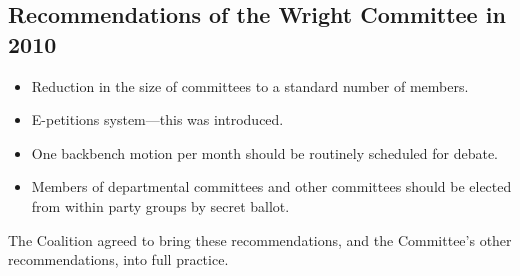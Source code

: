 \documentclass[12pt]{article}
\begin{document}
\subsection*{Recommendations of the Wright Committee in 2010}

\begin{itemize}
	\item{Reduction in the size of committees to a standard number of members.}
	\item{E-petitions system---this was introduced.}
	\item{One backbench motion per month should be routinely scheduled for debate.}
	\item{Members of departmental committees and other committees should be elected from within party groups by secret ballot.}
\end{itemize}

The Coalition agreed to bring these recommendations, and the Committee's other recommendations, into full practice.
\end{document}
